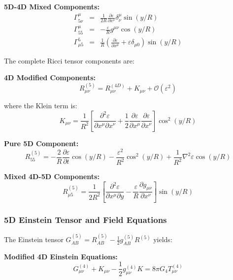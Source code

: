 \documentclass[12pt]{iopart}
\begin{document}
\textbf{5D-4D Mixed Components:}
\begin{eqnarray}
\Gamma^{\mu}_{5\nu} &=& \frac{1}{2R}\frac{\partial \varepsilon}{\partial x^\nu}\delta^{\mu}_{\nu}\sin(y/R) \\
\Gamma^{\mu}_{55} &=& -\frac{\varepsilon}{R}g^{\mu\nu}\cos(y/R) \\
\Gamma^{5}_{\mu 5} &=& \frac{1}{R}\left(\frac{\partial \varepsilon}{\partial x^\mu} + \varepsilon\delta_{\mu 0}\right)\sin(y/R)
\end{eqnarray}

The complete Ricci tensor components are:

\textbf{4D Modified Components:}
\begin{equation}
R_{\mu\nu}^{(5)} = R_{\mu\nu}^{(4D)} + K_{\mu\nu} + \mathcal{O}(\varepsilon^2)
\label{eq:ricci_4d_modified}
\end{equation}

where the Klein term is:
\begin{equation}
K_{\mu\nu} = \frac{1}{R^2}\left[\frac{\partial^2 \varepsilon}{\partial x^\mu \partial x^\nu} + \frac{1}{2}\frac{\partial \varepsilon}{\partial x^\mu}\frac{\partial \varepsilon}{\partial x^\nu}\right]\cos^2(y/R)
\label{eq:klein_term_explicit}
\end{equation}

\textbf{Pure 5D Component:}
\begin{equation}
R_{55}^{(5)} = -\frac{2}{R}\frac{\partial \varepsilon}{\partial t}\cos(y/R) - \frac{\varepsilon^2}{R^2}\cos^2(y/R) + \frac{1}{R^2}\nabla^2\varepsilon \cos(y/R)
\label{eq:ricci_55}
\end{equation}

\textbf{Mixed 4D-5D Components:}
\begin{equation}
R_{\mu 5}^{(5)} = \frac{1}{2R^2}\left[\frac{\partial^2 \varepsilon}{\partial x^\mu \partial y} - \frac{\varepsilon}{R}\frac{\partial g_{\mu\nu}}{\partial x^\nu}\right]\sin(y/R)
\label{eq:ricci_mixed}
\end{equation}

\subsubsection{5D Einstein Tensor and Field Equations}

The Einstein tensor $G_{AB}^{(5)} = R_{AB}^{(5)} - \frac{1}{2}g_{AB}^{(5)}R^{(5)}$ yields:

\textbf{Modified 4D Einstein Equations:}
\begin{equation}
G_{\mu\nu}^{(4)} + K_{\mu\nu} - \frac{1}{2}g_{\mu\nu}^{(4)}K = 8\pi G_4 T_{\mu\nu}^{(4)}
\label{eq:modified_4d_einstein}
\end{equation}
\end{document}
